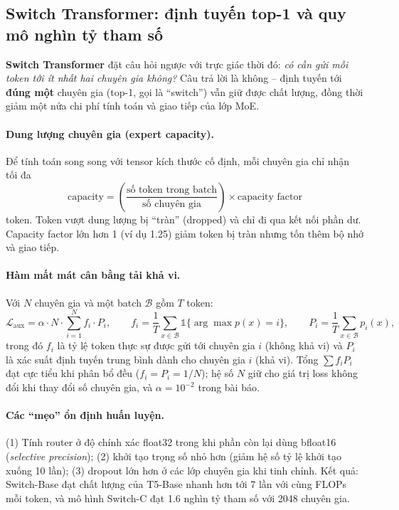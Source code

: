 \subsection{Switch Transformer: định tuyến top-1 và quy mô nghìn tỷ tham số}
\label{ssec:switch_transformer}
\textbf{Switch Transformer} \cite{fedus2022switch} đặt câu hỏi ngược với trực giác thời đó: \emph{có cần gửi mỗi token tới ít nhất hai chuyên gia không?} Câu trả lời là không -- định tuyến tới \textbf{đúng một} chuyên gia (top-1, gọi là “switch”) vẫn giữ được chất lượng, đồng thời giảm một nửa chi phí tính toán và giao tiếp của lớp MoE.

\paragraph{Dung lượng chuyên gia (expert capacity).} Để tính toán song song với tensor kích thước cố định, mỗi chuyên gia chỉ nhận tối đa
\[
\text{capacity} = \left(\frac{\text{số token trong batch}}{\text{số chuyên gia}}\right) \times \text{capacity factor}
\]
token. Token vượt dung lượng bị “tràn” (dropped) và chỉ đi qua kết nối phần dư. Capacity factor lớn hơn 1 (ví dụ 1.25) giảm token bị tràn nhưng tốn thêm bộ nhớ và giao tiếp.

\paragraph{Hàm mất mát cân bằng tải khả vi.} Với $N$ chuyên gia và một batch $\mathcal{B}$ gồm $T$ token:
\[
\mathcal{L}_{\text{aux}} = \alpha \cdot N \cdot \sum_{i=1}^{N} f_i \cdot P_i,
\qquad
f_i = \frac{1}{T}\sum_{x\in\mathcal{B}} \mathbb{1}\{\arg\max p(x) = i\},
\qquad
P_i = \frac{1}{T}\sum_{x\in\mathcal{B}} p_i(x),
\]
trong đó $f_i$ là tỷ lệ token thực sự được gửi tới chuyên gia $i$ (không khả vi) và $P_i$ là xác suất định tuyến trung bình dành cho chuyên gia $i$ (khả vi). Tổng $\sum f_i P_i$ đạt cực tiểu khi phân bổ đều ($f_i = P_i = 1/N$); hệ số $N$ giữ cho giá trị loss không đổi khi thay đổi số chuyên gia, và $\alpha = 10^{-2}$ trong bài báo.

\paragraph{Các “mẹo” ổn định huấn luyện.} (1) Tính router ở độ chính xác float32 trong khi phần còn lại dùng bfloat16 (\emph{selective precision}); (2) khởi tạo trọng số nhỏ hơn (giảm hệ số tỷ lệ khởi tạo xuống 10 lần); (3) dropout lớn hơn ở các lớp chuyên gia khi tinh chỉnh. Kết quả: Switch-Base đạt chất lượng của T5-Base nhanh hơn tới 7 lần với cùng FLOPs mỗi token, và mô hình Switch-C đạt 1.6 nghìn tỷ tham số với 2048 chuyên gia.


